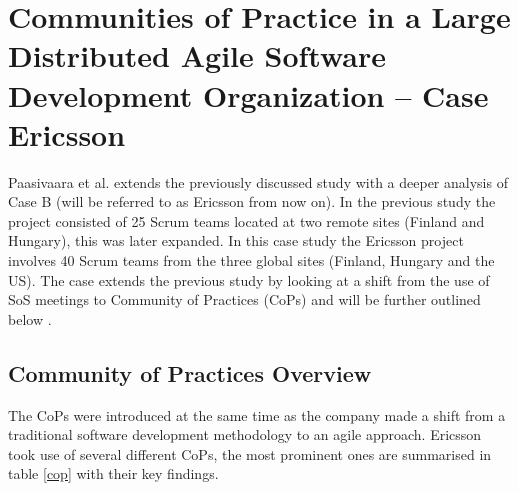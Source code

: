 \section{Communities of Practice in a Large Distributed Agile Software Development Organization – Case Ericsson}

Paasivaara et al. extends the previously discussed study with a deeper analysis of Case B (will be referred to as Ericsson from now on). In the previous study the project consisted of 25 Scrum teams located at two remote sites (Finland and Hungary), this was later expanded. In this case study the Ericsson project involves 40 Scrum teams from the three global sites (Finland, Hungary and the US). The case extends the previous study by looking at a shift from the use of SoS meetings to Community of Practices (CoPs) and will be further outlined below \cite{Paasivaara2014}.

\subsection{Community of Practices Overview}

The CoPs were introduced at the same time as the company made a shift from a traditional software development methodology to an agile approach. Ericsson took use of several different CoPs, the most prominent ones are summarised in table \ref{cop} with their key findings.

